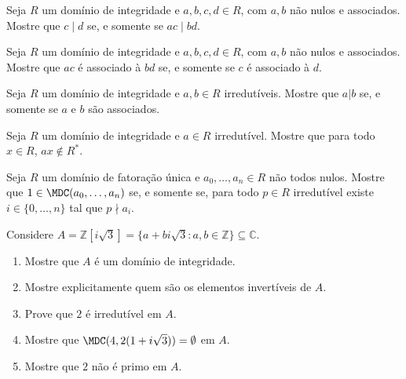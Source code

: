 \begin{exer}
    Seja $R$ um domínio de integridade e $a, b, c, d \in R$, com $a, b$ não nulos e associados. Mostre que $c\mid d$ se, e somente se $ac\mid bd$.
\end{exer}
\begin{exer}
    Seja $R$ um domínio de integridade e $a, b, c, d \in R$, com $a, b$ não nulos e associados. Mostre que $ac$ é associado à $bd$ se, e somente se $c$ é associado à $d$.
\end{exer}

\begin{exer}
    Seja $R$ um domínio de integridade e $a, b \in R$ irredutíveis. Mostre que $a|b$ se, e somente se $a$ e $b$ são associados.
\end{exer}
\begin{exer}
    Seja $R$ um domínio de integridade e $a \in R$ irredutível. Mostre que para todo $x \in R$, $ax\notin R^*$.
\end{exer}

\begin{exer}
    Seja $R$ um domínio de fatoração única e $a_0, \dots, a_n \in R$ não todos nulos. Mostre que $1 \in \MDC(a_0, \dots, a_n)$ se, e somente se, para todo $p \in R$ irredutível existe $i \in \{0, \dots, n\}$ tal que $p\nmid a_i$.
\end{exer}

\begin{exer}
    Considere $A=\mathbb Z[i\sqrt 3]=\{a+bi\sqrt 3: a, b \in \mathbb Z\}\subseteq \mathbb C$.
    \begin{enumerate}[label=\alph*)]
    \item Mostre que $A$ é um domínio de integridade.
    \item Mostre explicitamente quem são os elementos invertíveis de $A$.
    \item Prove que $2$ é irredutível em $A$.
    \item Mostre que $\MDC(4, 2(1+i\sqrt 3))= \emptyset$ em $A$.
    \item Mostre que $2$ não é primo em $A$.
    \end{enumerate}
\end{exer}